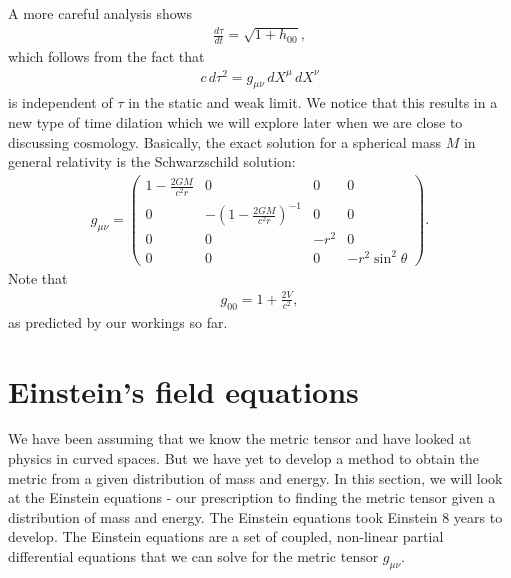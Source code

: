 \documentclass{book}
\theoremstyle{definition}
\begin{document}
A more careful analysis shows 
\begin{align*}
\frac{d\tau}{dt} = \sqrt{1+ h_{00}},
\end{align*}
which follows from the fact that  
\begin{align*}
c\,d\tau^2 = g_{\mu\nu}\,dX^\mu\,dX^\nu
\end{align*}
is independent of $\tau$ in the static and weak limit. We notice that this results in a new type of time dilation which we will explore later when we are close to discussing cosmology. Basically, the exact solution for a spherical mass $M$ in general relativity is the Schwarzschild solution:
\begin{align*}
g_{\mu\nu} = \begin{pmatrix}
1 - \frac{2GM}{c^2r} & 0 & 0 & 0 \\
0 & -\left(1-\frac{2GM}{c^2r} \right)^{-1} & 0 & 0\\
0 & 0 & -r^2 & 0\\
0 & 0 & 0 & -r^2\sin^2\theta
\end{pmatrix}.
\end{align*}
Note that
\begin{align*}
g_{00} = 1 + \frac{2V}{c^2},
\end{align*}
as predicted by our workings so far. 

\newpage

\chapter{Einstein's field equations}
We have been assuming that we know the metric tensor and have looked at physics in curved spaces. But we have yet to develop a method to obtain the metric from a given distribution of mass and energy. In this section, we will look at the Einstein equations - our prescription to finding the metric tensor given a distribution of mass and energy. The Einstein equations took Einstein 8 years to develop. The Einstein equations are a set of coupled, non-linear partial differential equations that we can solve for the metric tensor $g_{\mu\nu}$.\\
\end{document}
